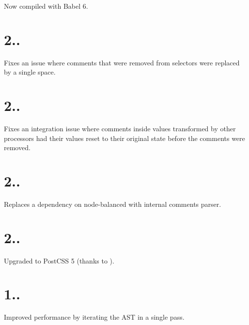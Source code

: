 
\begin{DoxyItemize}
\item Now compiled with Babel 6.
\end{DoxyItemize}

\section*{2..}


\begin{DoxyItemize}
\item Fixes an issue where comments that were removed from selectors were replaced by a single space.
\end{DoxyItemize}

\section*{2..}


\begin{DoxyItemize}
\item Fixes an integration issue where comments inside values transformed by other processors had their values reset to their original state before the comments were removed.
\end{DoxyItemize}

\section*{2..}


\begin{DoxyItemize}
\item Replaces a dependency on node-\/balanced with internal comments parser.
\end{DoxyItemize}

\section*{2..}


\begin{DoxyItemize}
\item Upgraded to Post\+C\+SS 5 (thanks to ).
\end{DoxyItemize}

\section*{1..}


\begin{DoxyItemize}
\item Improved performance by iterating the A\+ST in a single pass.
\end{DoxyItemize}

